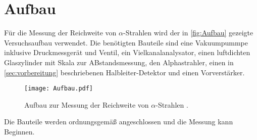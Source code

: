 \section{Aufbau}
\label{sec:Aufbau}
Für die Messung der Reichweite von $\alpha$-Strahlen wird der in \autoref{fig:Aufbau} gezeigte Versuchsaufbau verwendet.
Die benötigten Bauteile sind eine Vakuumpummpe inklusive Druckmessgerät und Ventil, ein Vielkanalanalysator, einen luftdichten Glaszylinder mit Skala zur ABstandsmessung,
den Alphastrahler, einen in \autoref{sec:vorbereitung} beschriebenen Halbleiter-Detektor und einen Vorverstärker.
\begin{figure}
    \centering
    \texttt{[image: Aufbau.pdf]}
    \caption{Aufbau zur Messung der Reichweite von $\alpha$-Strahlen \cite{ap701}.}
    \label{fig:Aufbau}
\end{figure}
Die Bauteile werden ordnungsgemäß angeschlossen und die Messung kann Beginnen.
